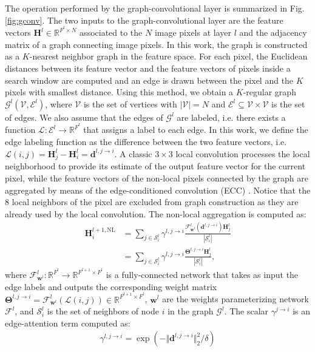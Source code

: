 \documentclass[journal]{IEEEtran}
\newcommand{\Hb}{\mathbf{H}}
\newcommand{\wb}{\mathbf{w}}
\newcommand{\fun}{\mathcal{F}}
\newcommand{\V}{\mathcal{V}}
\newcommand{\E}{\mathcal{E}}
\newcommand{\G}{\mathcal{G}}
\newcommand{\Sx}{\mathcal{S}}
\newcommand{\RR}{\mathbb{R}}
\begin{document}
The operation performed by the graph-convolutional layer is summarized in Fig. \ref{fig:gconv}. The two inputs to the graph-convolutional layer are the feature vectors $\Hb^l \in \RR^{F^l \times N}$ associated to the $N$ image pixels at layer $l$ and the adjacency matrix of a graph connecting image pixels. In this work, the graph is constructed as a $K$-nearest neighbor graph in the feature space. For each pixel, the Euclidean distances between its feature vector and the feature vectors of pixels inside a search window are computed and an edge is drawn between the pixel and the $K$ pixels with smallest distance. Using this method, we obtain a $K$-regular graph $\G^l(\V,\E^l)$, where $\V$ is the set of vertices with $|\V|=N$ and $\E^l\subseteq \mathcal{V}\times\mathcal{V}$ is the set of edges. We also assume that the edges of $\G^l$ are labeled, i.e. there exists a function $\mathcal{L}:\mathcal{E}^l\to \RR^{F^l}$ that assigns a label to each edge. In this work, we define the edge labeling function as the difference between the two feature vectors, i.e. $\mathcal{L}(i,j)=\Hb_j^l-\Hb_i^l=\mathbf{d}^{l,j\to i}$.  A classic $3 \times 3$ local convolution processes the local neighborhood to provide its estimate of the output feature vector for the current pixel, while the feature vectors of the non-local pixels connected by the graph are aggregated by means of the edge-conditioned convolution (ECC) \cite{simonovsky2017dynamic}. Notice that the 8 local neighbors of the pixel are excluded from graph construction as they are already used by the local convolution.
The non-local aggregation is computed as:
\begin{align}
\label{eq:ecc}
\Hb_i^{l+1,\mathrm{NL}}  &=  \sum_{j\in\Sx_i^l} \gamma^{l,j\to i} \frac{\fun_{\wb^l}^l\left(\mathbf{d}^{l,j\to i}\right)\Hb_j^l}{|\Sx_i^l|}\nonumber\\&= \sum_{j\in\Sx_i^l} \gamma^{l,j\to i} \frac{\bm{\Theta}^{l,j\to i}\Hb_j^l}{|\Sx_i^l|},
\end{align}
where $\fun_{\wb^l}^l:\RR^{F^l}\to\RR^{F^{l+1}\times F^{l}}$ is a fully-connected network that takes as input the edge labels and outputs the corresponding weight matrix $\bm{\Theta}^{l,j\to i} = \fun_{\wb^l}^l\left(\mathcal{L}(i,j)\right) \in\RR^{F^{l+1}\times F^{l}}$, $\wb^l$ are the weights parameterizing network $\fun^l$, and $\Sx_i^l$ is the set of neighbors of node $i$ in the graph $\G^l$. The scalar $\gamma^{j\to i}$ is an edge-attention term computed as:
\begin{align} \label{eq:edge_attention}
    \gamma^{l,j\to i} = \exp\left( - \Vert \mathbf{d}^{l,j\to i} \Vert^2_2 / \delta \right)
\end{align}
\end{document}
